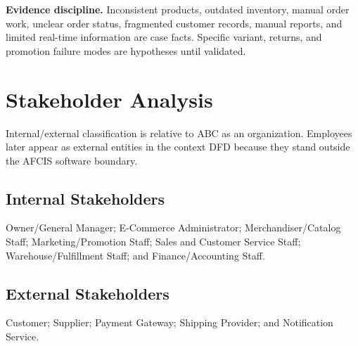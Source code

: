 \documentclass[10pt,a4paper]{article}
\begin{document}
\vfill
\colorbox{TableGray}{\parbox{\dimexpr\textwidth-2\fboxsep}{\footnotesize
\textbf{Evidence discipline.} Inconsistent products, outdated inventory, manual order work, unclear order status, fragmented customer records, manual reports, and limited real-time information are case facts. Specific variant, returns, and promotion failure modes are hypotheses until validated.}}
\newpage

\section{Stakeholder Analysis}
Internal/external classification is relative to ABC as an organization. Employees later appear as external entities in the context DFD because they stand outside the AFCIS software boundary.

\subsection{Internal Stakeholders}
Owner/General Manager; E-Commerce Administrator; Merchandiser/Catalog Staff; Marketing/Promotion Staff; Sales and Customer Service Staff; Warehouse/Fulfillment Staff; and Finance/Accounting Staff.

\subsection{External Stakeholders}
Customer; Supplier; Payment Gateway; Shipping Provider; and Notification Service.
\end{document}

